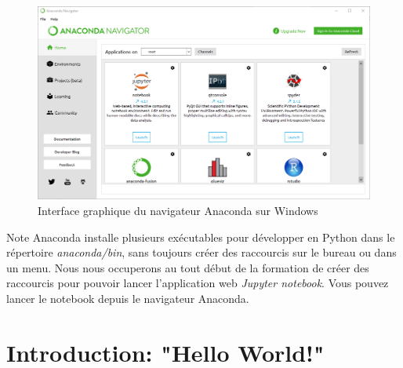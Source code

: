 \documentclass{beamer}
\begin{document}
\begin{frame}

\begin{figure}[!ht]  %
  \centerline{\includegraphics[width=0.7\linewidth]{imgs/AnacondaNavigator.png}}
  \caption{
  Interface graphique du navigateur Anaconda sur Windows
  }
\end{figure}
\end{frame}

\begin{frame}

\begin{block}{Note}
Anaconda installe plusieurs exécutables pour développer en Python dans le répertoire \emph{anaconda/bin}, sans toujours créer des raccourcis sur le bureau ou dans un menu. Nous nous occuperons au tout début de la formation de créer des raccourcis pour pouvoir lancer l'application web \emph{Jupyter notebook}. Vous pouvez lancer le notebook depuis le navigateur Anaconda.
\end{block}
\end{frame}

\section{Introduction: "Hello World!"}
\end{document}
